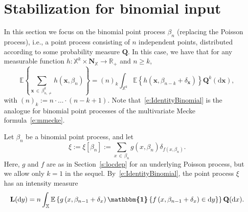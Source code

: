 \documentclass[AHL,Unicode,longabstracts]{cedram}
\newcommand*\bL{\mathbf{L}}
\newcommand*\bN{\mathbf{N}}
\newcommand{\bx}{\mathbf{x}}
\newcommand{\bQ}{\mathbf{Q}}
\newcommand*\R{\mathbb{R}}
\newcommand*\X{\mathbb{X}}
\newcommand{\E}{\mathbb{E}}
\newcommand*\md{\mathrm{d}}
\newcommand{\mean}[1] {\E\left\{{#1}\right\}}
\newcommand{\ind}{\boldsymbol{\mathbbm{1}}}
\begin{document}
\section{Stabilization for binomial input}\label{s:locdep_binomial}

In this section we focus on the binomial {point} process $\beta_n$ (replacing the Poisson process), i.e., a point process consisting of $n$ independent points, distributed according to some probability measure $\bQ$. In this case, we have that for any measurable function $h: \X^k \times \bN_{\X}\to\R_+$ and $n\geq k$,
\begin{equation}\label{e:IdentityBinomial}
\mean{\sum_{\bx\,\in\,\beta^k_{n,\ne}} h(\bx,\beta_n)} = (n)_k \int_{\X^k}\mean{h\left(\bx,\beta_{n-k}+\delta_{\bx}\right)}\bQ^k(\md \bx),
\end{equation}
with $(n)_k:=n\cdot\hdots\cdot (n-k+1)$. Note that~\eqref{e:IdentityBinomial} is the analogue for binomial point processes of the multivariate Mecke formula~\eqref{e:mmecke}.

Let $\beta_n$ be a binomial point process, and let
\[
\xi:= {\xi\left[\beta_n\right] :=} \sum_{x\,\in\,\beta_n} g(x,\beta_n) \delta_{f\left(x,\beta_n\right)}.
\]
Here, $g$ and $f$ are as in Section~\ref{s:locdep} for an underlying Poisson process, but we allow only $k=1$ in the sequel. By~\eqref{e:IdentityBinomial}, the point process $\xi$ has an intensity measure
\begin{equation}\label{e:IntensityMeasureBinomial}
\bL({\md y})= n \int_{\X} \mean{g\left(x,\beta_{n-1}+\delta_x\right) \ind\left\{f\left(x,\beta_{n-1}+\delta_x\right)\in \md y\right\}} \bQ(\md x).
\end{equation}
\end{document}
